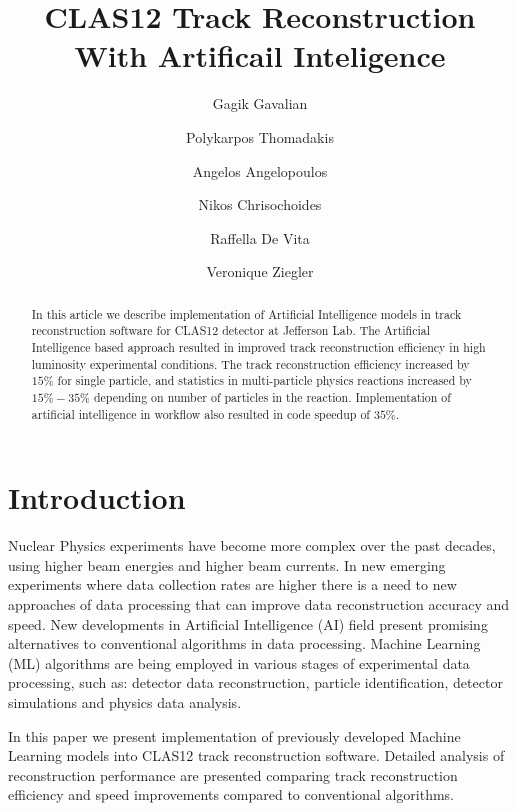 \documentclass[preprint,12pt]{elsarticle}
\title{CLAS12 Track Reconstruction With Artificail Inteligence }
\author[1]{Gagik Gavalian}
\author[2]{Polykarpos Thomadakis }
\author[2]{Angelos Angelopoulos}
\author[2]{Nikos Chrisochoides}
\author[1]{Raffella De Vita}
\author[1]{Veronique Ziegler}
\begin{document}

\begin{abstract}

  In this article we describe implementation of Artificial Intelligence models in track reconstruction software for CLAS12 detector at Jefferson Lab.
 The Artificial Intelligence based approach resulted in improved track reconstruction efficiency in high luminosity experimental conditions.  The track
 reconstruction efficiency increased by $15\%$ for single particle, and statistics in multi-particle physics reactions increased by $15\%-35\%$ depending 
 on number of particles in the reaction. Implementation of artificial intelligence in workflow also resulted in code speedup of $35\%$.
\end{abstract}
\maketitle


\section{Introduction}
\indent

Nuclear Physics experiments have become more complex over the past decades, using higher beam energies and higher beam currents. In new emerging experiments where data collection rates are higher there is a need to new approaches of data processing that can improve data reconstruction accuracy and speed. New developments in Artificial Intelligence (AI) field present promising alternatives to conventional algorithms in data processing. Machine Learning (ML) algorithms are being employed in various stages of experimental data processing, such as: detector data reconstruction, particle identification, detector simulations and physics data analysis. 

In this paper we present implementation of previously developed Machine Learning models into CLAS12 track reconstruction software. Detailed analysis 
of reconstruction performance are presented comparing track reconstruction efficiency and speed improvements compared to conventional algorithms.









\end{document}
